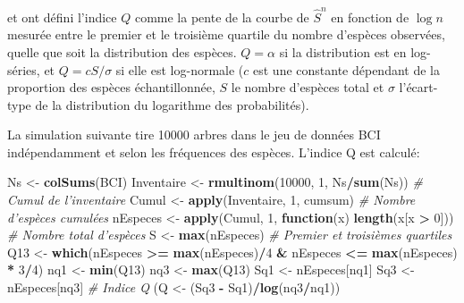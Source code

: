 \documentclass[
  11pt,
  french,
  a4paper,
  extrafontsizes,onecolumn,openright
  ]{memoir}
\newenvironment{Shaded}{\begin{snugshade}}{\end{snugshade}}
\newcommand{\CommentTok}[1]{\textcolor[rgb]{0.56,0.35,0.01}{\textit{#1}}}
\newcommand{\ControlFlowTok}[1]{\textcolor[rgb]{0.13,0.29,0.53}{\textbf{#1}}}
\newcommand{\DecValTok}[1]{\textcolor[rgb]{0.00,0.00,0.81}{#1}}
\newcommand{\KeywordTok}[1]{\textcolor[rgb]{0.13,0.29,0.53}{\textbf{#1}}}
\newcommand{\NormalTok}[1]{#1}
\newcommand{\OperatorTok}[1]{\textcolor[rgb]{0.81,0.36,0.00}{\textbf{#1}}}
\newcommand{\StringTok}[1]{\textcolor[rgb]{0.31,0.60,0.02}{#1}}
\begin{document}
\textcite{Kempton1976} et \textcite{Kempton1978} ont défini l'indice \(Q\) comme la pente de la courbe de \(\hat{S}^{n}\) en fonction de \(\log{n}\) mesurée entre le premier et le troisième quartile du nombre d'espèces observées, quelle que soit la distribution des espèces.
\(Q = \alpha\) si la distribution est en log-séries, et \(Q = {c S}/{\sigma}\) si elle est log-normale (\(c\) est une constante dépendant de la proportion des espèces échantillonnée, \(S\) le nombre d'espèces total et \(\sigma\) l'écart-type de la distribution du logarithme des probabilités).

La simulation suivante tire 10000 arbres dans le jeu de données BCI indépendamment et selon les fréquences des espèces.
L'indice Q est calculé:

\scriptsize

\begin{Shaded}
\begin{Highlighting}[]
\NormalTok{Ns <-}\StringTok{ }\KeywordTok{colSums}\NormalTok{(BCI)}
\NormalTok{Inventaire <-}\StringTok{ }\KeywordTok{rmultinom}\NormalTok{(}\DecValTok{10000}\NormalTok{, }\DecValTok{1}\NormalTok{, Ns}\OperatorTok{/}\KeywordTok{sum}\NormalTok{(Ns))}
\CommentTok{# Cumul de l'inventaire}
\NormalTok{Cumul <-}\StringTok{ }\KeywordTok{apply}\NormalTok{(Inventaire, }\DecValTok{1}\NormalTok{, cumsum)}
\CommentTok{# Nombre d'espèces cumulées}
\NormalTok{nEspeces <-}\StringTok{ }\KeywordTok{apply}\NormalTok{(Cumul, }\DecValTok{1}\NormalTok{, }\ControlFlowTok{function}\NormalTok{(x) }\KeywordTok{length}\NormalTok{(x[x }\OperatorTok{>}\StringTok{ }\DecValTok{0}\NormalTok{]))}
\CommentTok{# Nombre total d'espèces}
\NormalTok{S <-}\StringTok{ }\KeywordTok{max}\NormalTok{(nEspeces)}
\CommentTok{# Premier et troisièmes quartiles}
\NormalTok{Q13 <-}\StringTok{ }\KeywordTok{which}\NormalTok{(nEspeces }\OperatorTok{>=}\StringTok{ }\KeywordTok{max}\NormalTok{(nEspeces)}\OperatorTok{/}\DecValTok{4} \OperatorTok{&}\StringTok{ }\NormalTok{nEspeces }\OperatorTok{<=}\StringTok{ }\KeywordTok{max}\NormalTok{(nEspeces) }\OperatorTok{*}
\StringTok{    }\DecValTok{3}\OperatorTok{/}\DecValTok{4}\NormalTok{)}
\NormalTok{nq1 <-}\StringTok{ }\KeywordTok{min}\NormalTok{(Q13)}
\NormalTok{nq3 <-}\StringTok{ }\KeywordTok{max}\NormalTok{(Q13)}
\NormalTok{Sq1 <-}\StringTok{ }\NormalTok{nEspeces[nq1]}
\NormalTok{Sq3 <-}\StringTok{ }\NormalTok{nEspeces[nq3]}
\CommentTok{# Indice Q}
\NormalTok{(Q <-}\StringTok{ }\NormalTok{(Sq3 }\OperatorTok{-}\StringTok{ }\NormalTok{Sq1)}\OperatorTok{/}\KeywordTok{log}\NormalTok{(nq3}\OperatorTok{/}\NormalTok{nq1))}
\end{Highlighting}
\end{Shaded}
\end{document}
